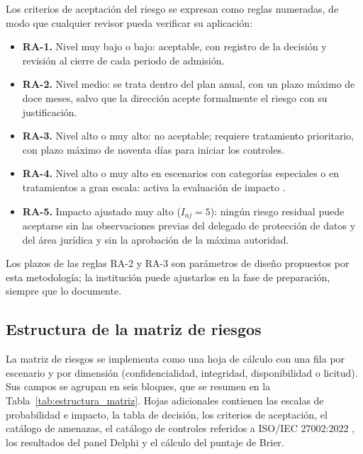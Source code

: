 Los criterios de aceptación del riesgo se expresan como reglas numeradas, de modo que cualquier revisor pueda verificar su aplicación:

\begin{itemize}
  \item \textbf{RA-1.} Nivel muy bajo o bajo: aceptable, con registro de la decisión y revisión al cierre de cada periodo de admisión.
  \item \textbf{RA-2.} Nivel medio: se trata dentro del plan anual, con un plazo máximo de doce meses, salvo que la dirección acepte formalmente el riesgo con su justificación.
  \item \textbf{RA-3.} Nivel alto o muy alto: no aceptable; requiere tratamiento prioritario, con plazo máximo de noventa días para iniciar los controles.
  \item \textbf{RA-4.} Nivel alto o muy alto en escenarios con categorías especiales o en tratamientos a gran escala: activa la evaluación de impacto \cite[art.~42]{lopdp2021}.
  \item \textbf{RA-5.} Impacto ajustado muy alto ($I_{aj} = 5$): ningún riesgo residual puede aceptarse sin las observaciones previas del delegado de protección de datos y del área jurídica y sin la aprobación de la máxima autoridad.
\end{itemize}

Los plazos de las reglas RA-2 y RA-3 son parámetros de diseño propuestos por esta metodología; la institución puede ajustarlos en la fase de preparación, siempre que lo documente.

\subsection{Estructura de la matriz de riesgos}

La matriz de riesgos se implementa como una hoja de cálculo con una fila por escenario y por dimensión (confidencialidad, integridad, disponibilidad o licitud). Sus campos se agrupan en seis bloques, que se resumen en la Tabla~\ref{tab:estructura_matriz}. Hojas adicionales contienen las escalas de probabilidad e impacto, la tabla de decisión, los criterios de aceptación, el catálogo de amenazas, el catálogo de controles referidos a ISO/IEC 27002:2022 \cite{iso27002_2022}, los resultados del panel Delphi y el cálculo del puntaje de Brier.

